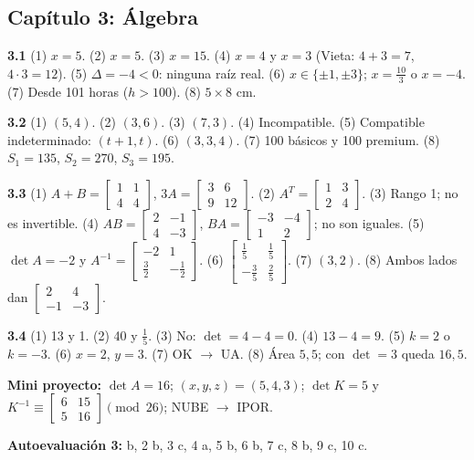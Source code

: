 \subsection*{Cap\'itulo 3: \'Algebra}
\textbf{3.1}\label{resp:3-1}\quad
(1) $x=5$. (2) $x=5$. (3) $x=15$. (4) $x=4$ y $x=3$ (Vieta: $4+3=7$, $4\cdot3=12$). (5) $\Delta=-4<0$: ninguna ra\'iz real. (6) $x\in\{\pm1,\pm3\}$; $x=\frac{10}{3}$ o $x=-4$. (7) Desde 101 horas ($h>100$). (8) $5\times8$ cm.

\medskip\noindent\textbf{3.2}\label{resp:3-2}\quad
(1) $(5, 4)$. (2) $(3, 6)$. (3) $(7, 3)$. (4) Incompatible. (5) Compatible indeterminado: $(t+1, t)$. (6) $(3, 3, 4)$. (7) 100 b\'asicos y 100 premium. (8) $S_1=135$, $S_2=270$, $S_3=195$.

\medskip\noindent\textbf{3.3}\label{resp:3-3}\quad
(1) $A+B=\begin{bmatrix}1&1\\4&4\end{bmatrix}$, $3A=\begin{bmatrix}3&6\\9&12\end{bmatrix}$. (2) $A^T=\begin{bmatrix}1&3\\2&4\end{bmatrix}$. (3) Rango 1; no es invertible. (4) $AB=\begin{bmatrix}2&-1\\4&-3\end{bmatrix}$, $BA=\begin{bmatrix}-3&-4\\1&2\end{bmatrix}$; no son iguales. (5) $\det A=-2$ y $A^{-1}=\begin{bmatrix}-2&1\\\frac32&-\frac12\end{bmatrix}$. (6) $\begin{bmatrix}\frac15&\frac15\\-\frac35&\frac25\end{bmatrix}$. (7) $(3, 2)$. (8) Ambos lados dan $\begin{bmatrix}2&4\\-1&-3\end{bmatrix}$.

\medskip\noindent\textbf{3.4}\label{resp:3-4}\quad
(1) 13 y 1. (2) 40 y $\frac15$. (3) No: $\det=4-4=0$. (4) $13-4=9$. (5) $k=2$ o $k=-3$. (6) $x=2$, $y=3$. (7) OK $\to$ UA. (8) \'Area $5{,}5$; con $\det=3$ queda $16{,}5$.

\medskip\noindent\textbf{Mini proyecto:} $\det A=16$; $(x, y, z)=(5, 4, 3)$; $\det K=5$ y $K^{-1}\equiv\begin{bmatrix}6&15\\5&16\end{bmatrix}\pmod{26}$; NUBE $\to$ IPOR.

\medskip\noindent\textbf{Autoevaluaci\'on 3:}\label{resp:q3} b, 2 b, 3 c, 4 a, 5 b, 6 b, 7 c, 8 b, 9 c, 10 c.
